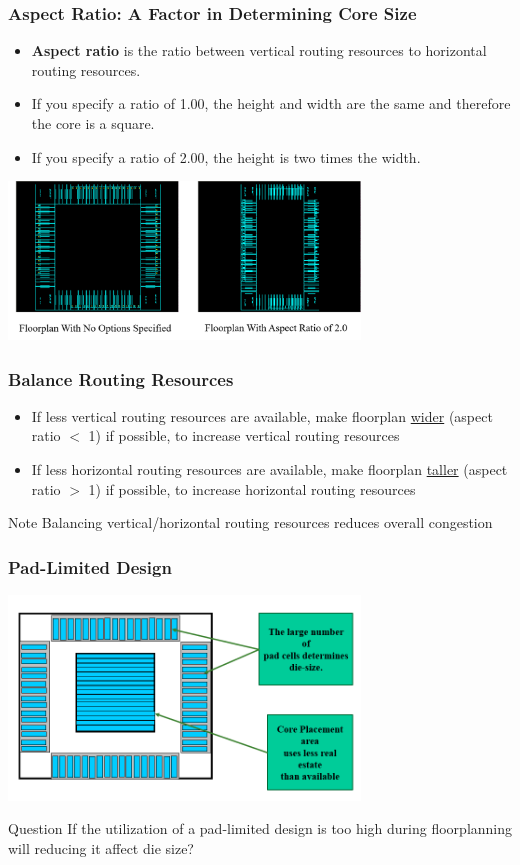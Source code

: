 \documentclass[compress]{beamer}
\begin{document}
\begin{frame}
	\frametitle{Aspect Ratio: A Factor in Determining Core Size}
		\begin{itemize}
			\item \textbf{Aspect ratio} is the ratio between vertical routing resources to horizontal routing resources.
			\item If you specify a ratio of 1.00, the height and width are the same and therefore the core is a square.
			\item If you specify a ratio of 2.00, the height is two times the width.
		\end{itemize}
	\begin{center}
		\includegraphics[width=0.7\textwidth]{aspectratio}
	\end{center}
\end{frame}	
\begin{frame}
	\frametitle{Balance Routing Resources}
		\begin{itemize}
			\item  If less vertical routing resources are available,
			make floorplan \underline{wider} (aspect ratio $<$ 1) if possible,
			to increase vertical routing resources
			\item If less horizontal routing resources are available,
			make floorplan \underline{taller} (aspect ratio $>$ 1) if possible,
			to increase horizontal routing resources
		\end{itemize}
	\begin{block}{Note}
		Balancing vertical/horizontal routing resources
		reduces overall congestion
	\end{block}
\end{frame}	
\begin{frame}
	\frametitle{Pad-Limited Design}
		\begin{center}
		\includegraphics[width=0.7\textwidth]{Pad-Limited}
	\end{center}
	\begin{alertblock}{Question}
		If the utilization of a pad-limited design is too high
		during floorplanning will reducing it affect die size?
	\end{alertblock}
\end{frame}
\end{document}
